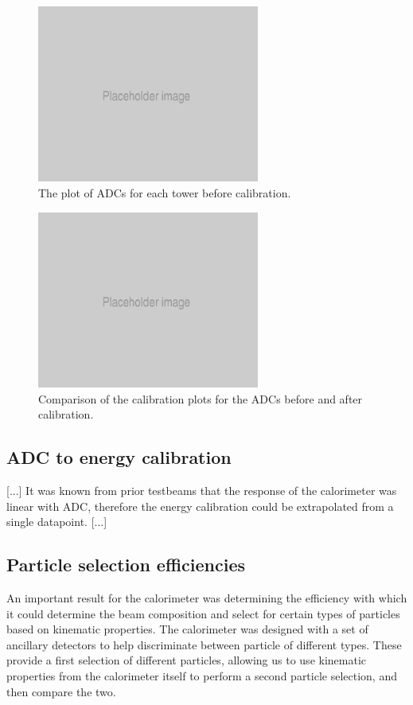 \begin{figure}[h]
	\centering
	\includegraphics[width=0.65\textwidth]{../Pictures/Placeholder.png}
	\caption{The plot of \acrshort{ADC}s for each tower before calibration.}
	\label{figure:testbeam/results/calibrationbefore}
\end{figure}

\begin{figure}[h]
	\centering
	\includegraphics[width=0.65\textwidth]{../Pictures/Placeholder.png}
	\caption{Comparison of the calibration plots for the \acrshort{ADC}s before and after calibration.}
	\label{figure:testbeam/results/calibrationafter}
\end{figure}

\subsection{ADC to energy calibration}
[...] It was known from prior testbeams that the response of the calorimeter was linear with ADC, therefore the energy calibration could be extrapolated from a single datapoint. [...]

\subsection{Particle selection efficiencies}
An important result for the calorimeter was determining the efficiency with which it could determine the beam composition and select for certain types of particles based on kinematic properties. The calorimeter was designed with a set of ancillary detectors to help discriminate between particle of different types. These provide a first selection of different particles, allowing us to use kinematic properties from the calorimeter itself to perform a second particle selection, and then compare the two.

